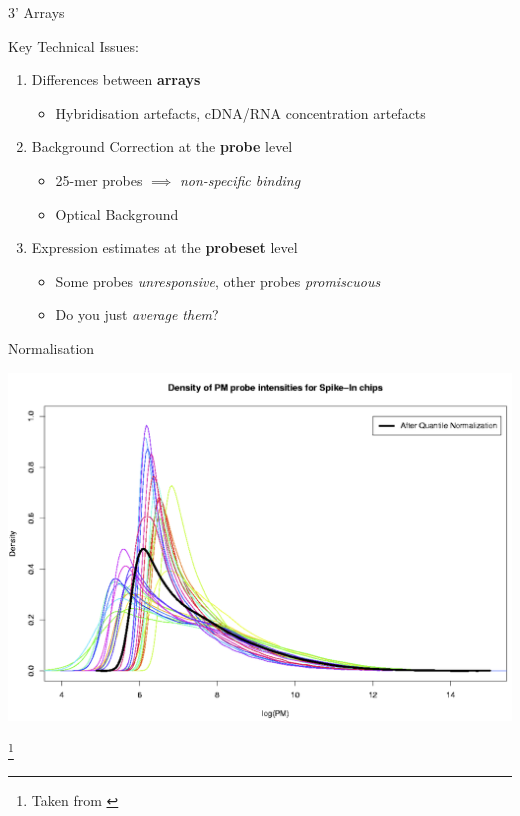 \documentclass[aspectratio=169,11pt]{beamer}
\newcommand\blfootnote[1]{%
  \begingroup
  \renewcommand\thefootnote{}\footnote{#1}%
  \addtocounter{footnote}{-1}%
  \endgroup
}
\begin{document}
\begin{frame}{3’ Arrays}

	Key Technical Issues: 

	\begin{enumerate}
		\item Differences between \textbf{arrays}
		\begin{itemize}
			\item Hybridisation artefacts, cDNA/RNA concentration artefacts
		\end{itemize}
		\item Background Correction at the \textbf{probe} level
		\begin{itemize}
			\item 25-mer probes $\implies$ \textit{non-specific binding}
			\item Optical Background
		\end{itemize}
		\item Expression estimates at the \textbf{probeset} level
		\begin{itemize}
			\item Some probes \textit{unresponsive}, other probes \textit{promiscuous}
			\item Do you just \textit{average them}?
		\end{itemize}
	\end{enumerate}
	
\end{frame}

\begin{frame}{Normalisation}

	\begin{center}
		\includegraphics[scale=0.12]{figures/quantileNorm.png} 
	\end{center}

\blfootnote{Taken from \cite{pmid12538238}}	

\end{frame}
\end{document}
